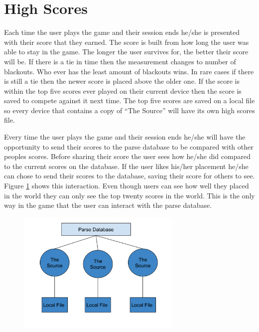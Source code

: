 \documentclass[msc,oneside]{ubcthesis}%
\begin{document}
\newpage
\section{High Scores}
    Each time the user plays the game and their session ends he/she is presented with their score that they earned. The score is built from how long the user was able to stay in the game. The longer the user survives for, the better their score will be. If there is a tie in time then the measurement changes to number of blackouts. Who ever has the least amount of blackouts wins. In rare cases if there is still a tie then the newer score is placed above the older one. If the score is within the top five scores ever played on their current device then the score is saved to compete against it next time. The top five scores are saved on a local file so every device that contains a copy of ``The Source'' will have its own high scores file.

    Every time the user plays the game and their session ends he/she will have the opportunity to send their scores to the parse database to be compared with other peoples scores. Before sharing their score the user sees how he/she did compared to the current scores on the database. If the user likes his/her placement he/she can chose to send their scores to the database, saving their score for others to see. Figure \ref{heighscores} shows this interaction. Even though users can see how well they placed in the world they can only see the top twenty scores in the world. This is the only way in the game that the user can interact with the parse database.

    \begin{figure}[hbt]
  \begin{center}
    \includegraphics[width=0.7\textwidth]{thesourceachitecture}
    \caption[System architecture]{\label{heighscores} }
  \end{center}
\end{figure}
\newpage
\end{document}
